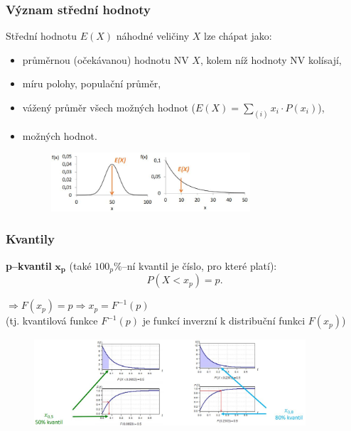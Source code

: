 \subsubsection{Význam střední hodnoty}
Střední hodnotu $E(X)$ náhodné veličiny $X$ lze chápat jako:
\begin{itemize}
	\item průměrnou (očekávanou) hodnotu NV $X$, kolem níž hodnoty NV kolísají,
	\item míru polohy, populační průměr,
	\item vážený průměr všech možných hodnot ($E(X) = \sum_{(i)}x_i \cdot P(x_i)$),
	\item {} možných hodnot.
	\begin{figure}[H]
			\centering
			\includegraphics[width=0.7\textwidth]{assets/11_stredni_hodnota}
	\end{figure}
\end{itemize}

\subsubsection{Kvantily}
\textbf{p--kvantil} $\mathbf{x_p}$ (také $100_p\%$--ní kvantil je číslo, pro které platí): $$P(X < x_p) = p.$$ 
\begin{center}
$\Rightarrow F(x_p) = p \Rightarrow x_p = F^{-1}(p)$ \\
(tj. kvantilová funkce $F^{-1}(p)$ je funkcí inverzní k distribuční funkci $F(x_p)$)
\begin{figure}[H]
			\centering
			\includegraphics[width=0.9\textwidth]{assets/11_kvantily}
	\end{figure}
\end{center}

